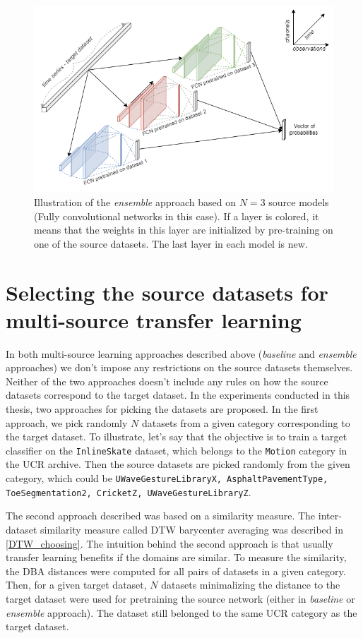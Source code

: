 \documentclass[a4paper,11pt,twoside]{report}
\theoremstyle{definition}
\begin{document}
\FloatBarrier
\begin{figure}[h!]
\centering
\includegraphics[width=17cm]{imgs/ensemble_architecture.png}
\caption{Illustration of the\textit{ ensemble }approach based on $N=3$ source models (Fully convolutional networks in this case). If a layer is colored, it means that the weights in this layer are initialized by pre-training on one of the source datasets. The last layer in each model is new.}
\label{fig:ensemble_architecture}
\end{figure}

\FloatBarrier


\section{Selecting the source datasets for multi-source transfer learning}\label{section:selecting}
In both multi-source learning approaches described above (\textit{baseline} and \textit{ensemble} approaches) we don't impose any restrictions on the source datasets themselves. Neither of the two approaches doesn't include any rules on how the source datasets correspond to the target dataset. In the experiments conducted in this thesis, two approaches for picking the datasets are proposed. In the first approach, we pick randomly $N$ datasets from a given category corresponding to the target dataset. To illustrate, let's say that the objective is to train a target classifier on the \texttt{InlineSkate} dataset, which belongs to the \texttt{Motion} category in the UCR archive. Then the source datasets are picked randomly from the given category, which could be \texttt{UWaveGestureLibraryX, AsphaltPavementType, ToeSegmentation2, CricketZ, UWaveGestureLibraryZ}.


The second approach described was based on a similarity measure. The inter-dataset similarity measure called DTW barycenter averaging was described in \ref{DTW_choosing}. The intuition behind the second approach is that usually transfer learning benefits if the domains are similar. To measure the similarity, the DBA distances were computed for all pairs of datasets in a given category. Then, for a given target dataset, $N$ datasets minimalizing the distance to the target dataset were used for pretraining the source network (either in \textit{baseline} or \textit{ensemble} approach). The dataset still belonged to the same UCR category as the target dataset.
\end{document}

